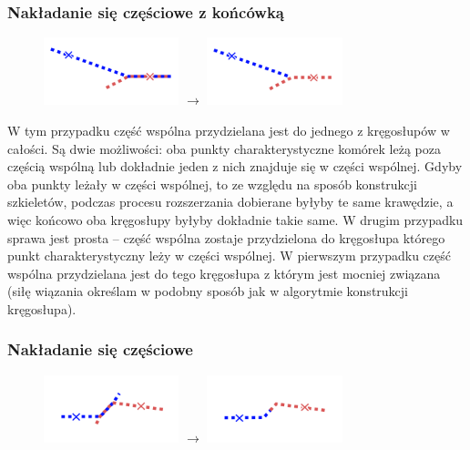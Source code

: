 \documentclass[declaration,shortabstract,mgr]{iithesis}
\begin{document}
\subsubsection{Nakładanie się częściowe z końcówką}

\begin{figure}[H]
  \centering
  \includegraphics[valign=m,width=0.35\textwidth]{images/overlap-pwv.png}
  $\rightarrow$
  \includegraphics[valign=m,width=0.35\textwidth]{images/overlap-pwv-solved.png}
\end{figure}

W tym przypadku część wspólna przydzielana jest do jednego z kręgosłupów w całości.
Są dwie możliwości: oba punkty charakterystyczne komórek leżą poza częścią wspólną lub dokładnie jeden z nich znajduje się w części wspólnej.
Gdyby oba punkty leżały w części wspólnej, to ze względu na sposób konstrukcji szkieletów, podczas procesu rozszerzania dobierane byłyby te same krawędzie, a więc końcowo oba kręgosłupy byłyby dokładnie takie same.
W drugim przypadku sprawa jest prosta -- część wspólna zostaje przydzielona do kręgosłupa którego punkt charakterystyczny leży w części wspólnej. W pierwszym przypadku część wspólna przydzielana jest do tego kręgosłupa z którym jest mocniej związana (siłę wiązania określam w podobny sposób jak w algorytmie konstrukcji kręgosłupa).

\subsubsection{Nakładanie się częściowe}

\begin{figure}[H]
  \centering
  \includegraphics[valign=m,width=0.35\textwidth]{images/overlap-p.png}
  $\rightarrow$
  \includegraphics[valign=m,width=0.35\textwidth]{images/overlap-p-solved.png}
\end{figure}
\end{document}
